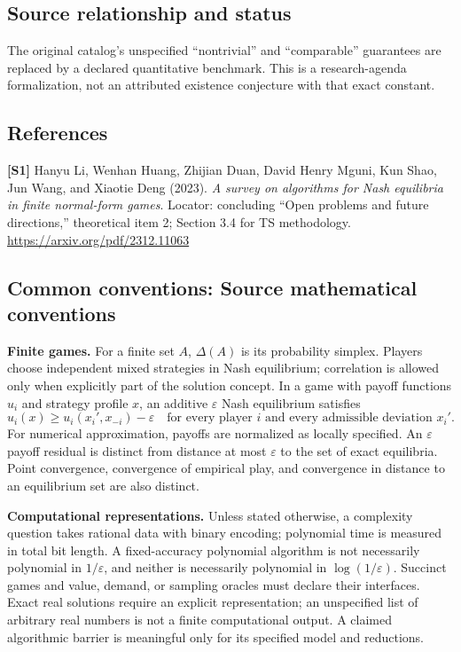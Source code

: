 \documentclass[11pt,a4paper]{article}
\begin{document}
\subsection*{Source relationship and status}
The original catalog's unspecified ``nontrivial'' and ``comparable'' guarantees are replaced by a declared quantitative benchmark. This is a research-agenda formalization, not an attributed existence conjecture with that exact constant.
\subsection*{References}
\begingroup\footnotesize\raggedright
{\footnotesize\raggedright
\textbf{[S1]} Hanyu Li, Wenhan Huang, Zhijian Duan, David Henry Mguni, Kun Shao, Jun Wang, and Xiaotie Deng (2023). \emph{A survey on algorithms for Nash equilibria in finite normal-form games}. Locator: concluding ``Open problems and future directions,'' theoretical item 2; Section 3.4 for TS methodology. \url{https://arxiv.org/pdf/2312.11063}\par}
\par\endgroup

\subsection*{Common conventions: Source mathematical conventions}

\textbf{Finite games.} For a finite set $A$, $\Delta(A)$ is its probability
simplex. Players choose independent mixed strategies in Nash equilibrium;
correlation is allowed only when explicitly part of the solution concept.
In a game with payoff functions $u_i$ and strategy profile $x$, an additive
$\varepsilon$ Nash equilibrium satisfies
\[
 u_i(x)\geq u_i(x_i',x_{-i})-\varepsilon
 \quad\text{for every player $i$ and every admissible deviation $x_i'$}.
\]
For numerical approximation, payoffs are normalized as locally specified.
An $\varepsilon$ payoff residual is distinct from distance at most
$\varepsilon$ to the set of exact equilibria. Point convergence, convergence
of empirical play, and convergence in distance to an equilibrium set are
also distinct.

\textbf{Computational representations.} Unless stated otherwise, a complexity
question takes rational data with binary encoding; polynomial time is measured
in total bit length. A fixed-accuracy polynomial algorithm is not necessarily
polynomial in $1/\varepsilon$, and neither is necessarily polynomial in
$\log(1/\varepsilon)$. Succinct games and value, demand, or sampling oracles
must declare their interfaces. Exact real solutions require an explicit
representation; an unspecified list of arbitrary real numbers is not a
finite computational output. A claimed algorithmic barrier is meaningful
only for its specified model and reductions.
\end{document}
